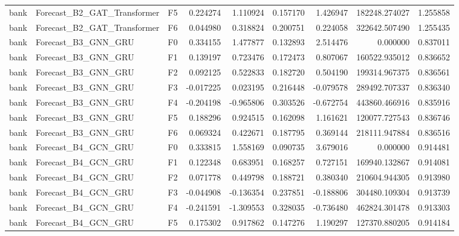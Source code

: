 \begin{tabular}{lllrrrrrr}
      bank &  Forecast\_B2\_GAT\_Transformer &  F5 &  0.224274 &  1.110924 & 0.157170 &  1.426947 &    182248.274027 &             1.255858 \\
      bank &  Forecast\_B2\_GAT\_Transformer &  F6 &  0.044980 &  0.318824 & 0.200751 &  0.224058 &    322642.507490 &             1.255435 \\
      bank &          Forecast\_B3\_GNN\_GRU &  F0 &  0.334155 &  1.477877 & 0.132893 &  2.514476 &         0.000000 &             0.837011 \\
      bank &          Forecast\_B3\_GNN\_GRU &  F1 &  0.139197 &  0.723476 & 0.172473 &  0.807067 &    160522.935012 &             0.836652 \\
      bank &          Forecast\_B3\_GNN\_GRU &  F2 &  0.092125 &  0.522833 & 0.182720 &  0.504190 &    199314.967375 &             0.836561 \\
      bank &          Forecast\_B3\_GNN\_GRU &  F3 & -0.017225 &  0.023195 & 0.216448 & -0.079578 &    289492.707337 &             0.836340 \\
      bank &          Forecast\_B3\_GNN\_GRU &  F4 & -0.204198 & -0.965806 & 0.303526 & -0.672754 &    443860.466916 &             0.835916 \\
      bank &          Forecast\_B3\_GNN\_GRU &  F5 &  0.188296 &  0.924515 & 0.162098 &  1.161621 &    120077.727543 &             0.836746 \\
      bank &          Forecast\_B3\_GNN\_GRU &  F6 &  0.069324 &  0.422671 & 0.187795 &  0.369144 &    218111.947884 &             0.836516 \\
      bank &          Forecast\_B4\_GCN\_GRU &  F0 &  0.333815 &  1.558169 & 0.090735 &  3.679016 &         0.000000 &             0.914481 \\
      bank &          Forecast\_B4\_GCN\_GRU &  F1 &  0.122348 &  0.683951 & 0.168257 &  0.727151 &    169940.132867 &             0.914081 \\
      bank &          Forecast\_B4\_GCN\_GRU &  F2 &  0.071778 &  0.449798 & 0.188721 &  0.380340 &    210604.944305 &             0.913980 \\
      bank &          Forecast\_B4\_GCN\_GRU &  F3 & -0.044908 & -0.136354 & 0.237851 & -0.188806 &    304480.109304 &             0.913739 \\
      bank &          Forecast\_B4\_GCN\_GRU &  F4 & -0.241591 & -1.309553 & 0.328035 & -0.736480 &    462824.301478 &             0.913303 \\
      bank &          Forecast\_B4\_GCN\_GRU &  F5 &  0.175302 &  0.917862 & 0.147276 &  1.190297 &    127370.880205 &             0.914184 \\

\end{tabular}
